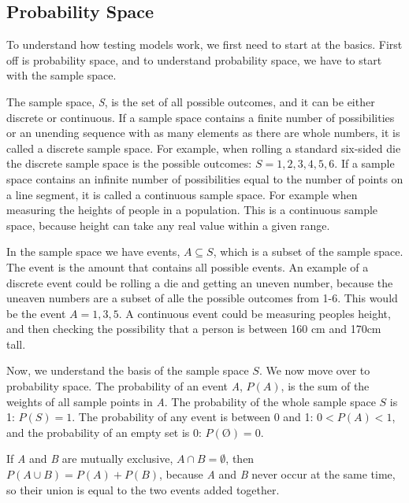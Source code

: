 \subsection{Probability Space}
To understand how testing models work, we first need to start at the basics. First off is probability space, and to understand probability space, we have to start with the sample space. \newline

\noindent The sample space, \textit{S}, is the set of all possible outcomes, and it can be either discrete or continuous. If a sample space contains a finite number of possibilities or an unending sequence with as many elements as there are whole numbers, it is called a discrete sample space. For example, when rolling a standard six-sided die the discrete sample space is the possible outcomes: $S={1,2,3,4,5,6}$. If a sample space contains an infinite number of possibilities equal to the number of points on a line segment, it is called a continuous sample space. For example when measuring the heights of people in a population. This is a continuous sample space, because height can take any real value within a given range.\newline

\noindent In the sample space we have events, $A\subseteq S$, which is a subset of the sample space. The event is the amount that contains all possible events. An example of a discrete event could be rolling a die and getting an uneven number, because the uneaven numbers are a subset of alle the possible outcomes from 1-6. This would be the event $A={1,3,5}$. A continuous event could be measuring peoples height, and then checking the possibility that a person is between 160 cm and 170cm tall.
\newline

\noindent Now, we understand the basis of the sample space $S$. We now move over to probability space. The probability of an event \textit{A}, $P(A)$, is the sum of the weights of all sample points in \textit{A}.
The probability of the whole sample space $S$ is 1: $P(S)=1$. The probability of any event is between 0 and 1: $0<P(A)<1$, and the probability of an empty set is 0: $P(Ø)=0$.
\newline
\newline

\noindent If \textit{A} and \textit{B} are mutually exclusive, $A \cap B = \emptyset$, then $P(A \cup B) = P(A)+P(B)$, because \textit{A} and \textit{B} never occur at the same time, so their union is equal to the two events added together. 
\newline

